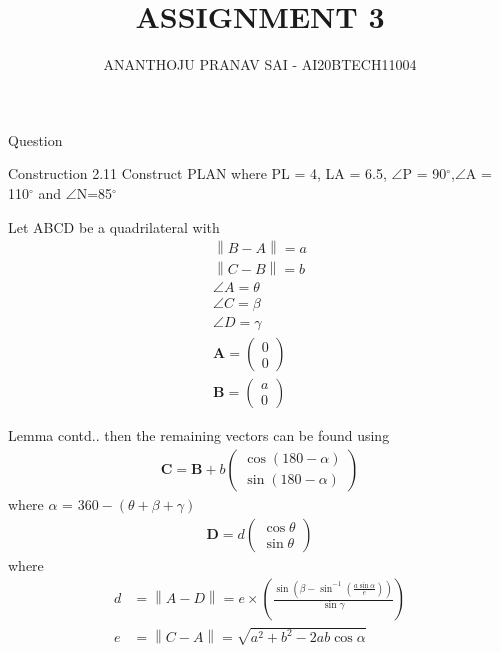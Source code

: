 \documentclass{beamer}
\title{ASSIGNMENT 3}
\author{ANANTHOJU PRANAV SAI - AI20BTECH11004}
\newcommand{\myvec}[1]{\ensuremath{\begin{pmatrix}#1\end{pmatrix}}}
\providecommand{\brak}[1]{\ensuremath{\left(#1\right)}}
\newcommand\norm[1]{\left\lVert#1\right\rVert}
\renewcommand{\vec}[1]{\mathbf{#1}}
\begin{document}
\begin{frame}
\titlepage
\end{frame}
\begin{frame}{Question}
    \begin{block}{Construction 2.11}
    Construct PLAN where PL = 4, LA = 6.5, $\angle$P = 90$^\circ$,$\angle$A = 110$^\circ$ and $\angle$N=85$^\circ$
    \end{block}
\end{frame}
\begin{frame}
\begin{lemma}
    Let ABCD be a quadrilateral with 
    \begin{align}
        \norm{B-A} = a\\
        \norm{C-B} = b\\
        \angle A = \theta\\
        \angle C = \beta\\
        \angle D = \gamma\\
        \vec{A} = \myvec{0\\
                         0}\\
        \vec{B} = \myvec{a\\
                         0}   
    \end{align}
\end{lemma}
\end{frame}
\begin{frame}
\begin{block}{Lemma contd..}
    then the remaining vectors can be found using 
    \begin{align}
        \vec{C} = \vec{B}+b\myvec{\cos{(180-\alpha)}\\
                                  \sin{(180-\alpha)}}
    \end{align}
    where $\alpha$ = $360-(\theta+\beta+\gamma)$
    \begin{align}
        \vec{D} = d\myvec{\cos{\theta}\\
                          \sin{\theta}}
    \end{align}
    where 
    \begin{align}
        d &= \norm{A-D} = e\times\brak{\frac{\sin{\brak{\beta-\sin^{-1}\brak{{\frac{a\sin\alpha}{e}}}}}}{\sin\gamma}}\\
        e &= \norm{C-A} = \sqrt{a^2+b^2-2ab\cos{\alpha}}
    \end{align}
\end{block}
\end{frame}
\end{document}

